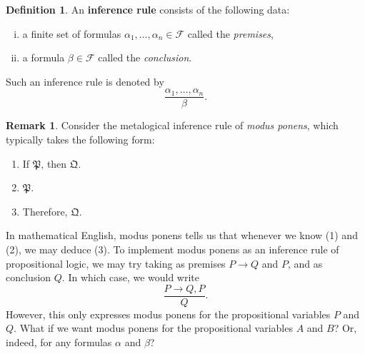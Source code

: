 \documentclass[12pt]{article}
\theoremstyle{definition}
\newtheorem{definition}[theorem]{Definition}
\newtheorem{remark}[theorem]{Remark}
\newcommand{\<}{\langle}
\renewcommand{\>}{\rangle}
\newcommand{\FF}{\mathcal{F}}
\newcommand{\PPP}{\mathfrak{P}}
\newcommand{\QQQ}{\mathfrak{Q}}
\newcommand{\keyword}{\textbf}
\begin{document}
\begin{definition}
    An \keyword{inference rule} consists of the following data:
    \begin{enumerate}[(i)]
        \item a finite set of formulas $\alpha_1, \dots, \alpha_n \in \FF$ called the \emph{premises},
        \item a formula $\beta \in \FF$ called the \emph{conclusion}.
    \end{enumerate}
    Such an inference rule is denoted by
    \[
        \frac{\alpha_1, \dots, \alpha_n}{\beta}.
    \]
\end{definition}

\begin{remark}
    Consider the metalogical inference rule of \emph{modus ponens}, which typically takes the following form:
    \begin{enumerate}[(1)]
        \item If $\PPP$, then $\QQQ$.
        \item $\PPP$.
        \item Therefore, $\QQQ$.
    \end{enumerate}
    In mathematical English, modus ponens tells us that whenever we know (1) and (2), we may deduce (3).
    To implement modus ponens as an inference rule of propositional logic, we may try taking as premises $P \to Q$ and $P$, and as conclusion $Q$.
    In which case, we would write
    \[
        \frac{P \to Q, P}{Q}.
    \]
    However, this only expresses modus ponens for the propositional variables $P$ and $Q$.
    What if we want modus ponens for the propositional variables $A$ and $B$?
    Or, indeed, for any formulas $\alpha$ and $\beta$?
\end{remark}
\end{document}
